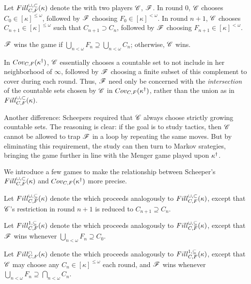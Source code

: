 \begin{game}
  Let $Fill^{\cup,\subset}_{C,F}(\kappa)$ denote the 
  with two players $\mathscr{C}$, $\mathscr{F}$. In round $0$, $\mathscr{C}$ chooses
  $C_0\in[\kappa]^{\leq\omega}$, followed by $\mathscr{F}$ choosing
  $F_0\in[\kappa]^{<\omega}$. In round $n+1$, $\mathscr{C}$ chooses
  $C_{n+1}\in[\kappa]^{\leq\omega}$ such that $C_{n+1}\supset C_n$, followed
  by $\mathscr{F}$ choosing $F_{n+1}\in[\kappa]^{<\omega}$.

  $\mathscr{F}$ wins the game if
  $\bigcup_{n<\omega} F_n\supseteq\bigcup_{n<\omega} C_n$; otherwise, $\mathscr{C}$
  wins.
\end{game}

In $Cov_{C,F}(\kappa^\dagger)$, $\mathscr{C}$ essentially chooses a countable set
to not include in her neighborhood of $\infty$, followed by $\mathscr{F}$ choosing
a finite subset of this complement to cover during each round. Thus,
$\mathscr{F}$ need only be concerned with the \textit{intersection} of the
countable sets chosen by $\mathscr{C}$ in $Cov_{C,F}(\kappa^\dagger)$, rather
than the union as in $Fill^{\cup,\subset}_{C,F}(\kappa)$.

Another difference: Scheepers required that $\mathscr{C}$ always choose strictly
growing countable sets. The reasoning is clear: if the goal is to study tactics,
then $\mathscr{C}$ cannot be allowed to trap $\mathscr{F}$ in a loop by repeating the same
moves. But by eliminating this requirement, the study can then turn to Markov
srategies, bringing the game further in line with the Menger game played upon
$\kappa^\dagger$.

We introduce a few games to make the relationship between Scheeper's
$Fill^{\cup,\subset}_{C,F}(\kappa)$ and $Cov_{C,F}(\kappa^\dagger)$ more precise.

\begin{game}
  Let $Fill^{\cup,\subseteq}_{C,F}(\kappa)$ denote the
   which proceeds analogously
  to $Fill^{\cup,\subset}_{C,F}(\kappa)$, except that $\mathscr{C}$'s restriction in round $n+1$
  is reduced to $C_{n+1}\supseteq C_n$.
\end{game}

\begin{game}
  Let $Fill^{1,\subseteq}_{C,F}(\kappa)$ denote the
   which proceeds analogously
  to $Fill^{\cup,\subseteq}_{C,F}(\kappa)$, except that $\mathscr{F}$ wins whenever
  $\bigcup_{n<\omega}F_n\supseteq C_0$.
\end{game}

\begin{game}
  Let $Fill^{\cap}_{C,F}(\kappa)$ denote the
   which proceeds analogously
  to $Fill^{1,\subseteq}_{C,F}(\kappa)$, except that $\mathscr{C}$ may choose any
  $C_n\in[\kappa]^{\leq\omega}$ each round, and $\mathscr{F}$ wins whenever
  $\bigcup_{n<\omega}F_n\supseteq\bigcap_{n<\omega}C_n$.
\end{game}

